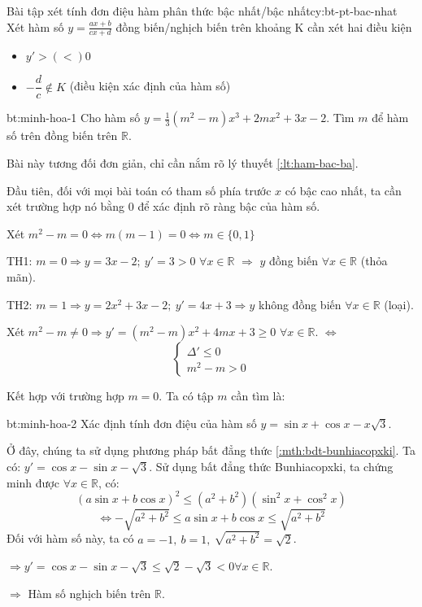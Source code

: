 \begin{chuy}{Bài tập xét tính đơn điệu hàm phân thức bậc nhất/bậc nhất}{cy:bt-pt-bac-nhat}
Xét hàm số $y = \frac{ax + b}{cx +d}$ đồng biến/nghịch biến trên khoảng K cần xét hai điều kiện
\begin{itemize}
    \item $y'> (<) 0$
    \item $-\dfrac{d}{c} \notin K$ \quad (điều kiện xác định của hàm số)
\end{itemize}
\end{chuy}

\begin{cauhoi}{bt:minh-hoa-1}
    Cho hàm số $y = \frac{1}{3}(m^2-m)x^3 + 2mx^2 + 3x -2$.
    Tìm $m$ để hàm số trên đồng biến trên $\mathbb{R}$.
\end{cauhoi}

\begin{loigiai}
    Bài này tương đối đơn giản, chỉ cần nắm rõ lý thuyết \ref{:lt:ham-bac-ba}.

    Đầu tiên, đối với mọi bài toán có tham số phía trước $x$ có bậc cao nhất, ta cần xét trường hợp nó bằng $0$ để xác định rõ ràng bậc của hàm số.

    Xét $m^2 - m = 0 \Leftrightarrow m(m-1) = 0 \Leftrightarrow m \in \{0, 1\}$

    TH1: $m = 0 \Rightarrow y = 3x -2;\ y'=3 > 0$ $\forall x \in \mathbb{R}$ $\Rightarrow$ $y$ đồng biến $\forall x \in \mathbb{R}$ (thỏa mãn).
    
    TH2: $m = 1 \Rightarrow y = 2x^2 + 3x -2;\ y' = 4x + 3 \Rightarrow y$ không đồng biến $\forall x \in \mathbb{R}$ (loại).
    
    Xét $m^2-m \neq 0 \Rightarrow y' = (m^2-m)x^2 + 4mx + 3 \geq 0$ $\forall x \in \mathbb{R}$.
    $\Leftrightarrow$
    \[
    \left\{
    \begin{array}{l}
        \Delta' \leq 0 \\
        m^2-m>0
    \end{array}
    \right.
    \]
    
    Kết hợp với trường hợp $m = 0$. Ta có tập $m$ cần tìm là:
\end{loigiai}

\begin{cauhoi}{bt:minh-hoa-2}
    Xác định tính đơn điệu của hàm số $y = \sin x + \cos x - x\sqrt{3}$.
\end{cauhoi}

\begin{loigiai}
    Ở đây, chúng ta sử dụng phương pháp bất đẳng thức \ref{:mth:bdt-bunhiacopxki}.
    Ta có: $y' = \cos x - \sin x - \sqrt{3}$.
    Sử dụng bất đẳng thức Bunhiacopxki, ta chứng minh được $\forall x \in \mathbb{R}$, có:
    \[
    (a\sin x + b\cos x)^2 \leq (a^2 + b^2)(\sin^2 x + \cos^2 x)
    \]
    \[
    \Leftrightarrow -\sqrt{a^2+b^2} \leq a\sin x + b\cos x \leq \sqrt{a^2+b^2}
    \]
    Đối với hàm số này, ta có $a = -1,\ b = 1,\ \sqrt{a^2 + b^2} = \sqrt{2}$.

    $\Rightarrow y' = \cos x - \sin x - \sqrt{3} \leq \sqrt{2} - \sqrt{3} < 0 \forall x \in \mathbb{R}$.

    $\Rightarrow$ Hàm số nghịch biến trên $\mathbb{R}$.
\end{loigiai}

